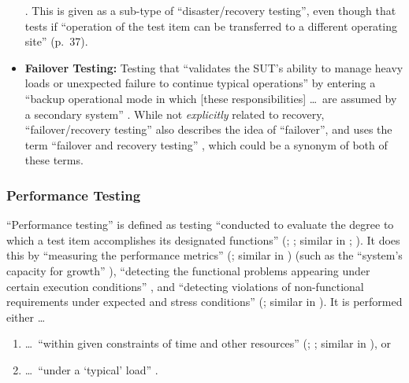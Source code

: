 \begin{itemize}
            \citep[p.~37]{IEEE2021}. This is given as a sub-type of
            ``disaster/recovery testing'', even though that tests if ``operation
            of the test item can be transferred to a different operating site''
            (p.~37).
      \item \textbf{Failover Testing:} Testing that ``validates the SUT's
            ability to manage heavy loads or unexpected failure to continue
            typical operations'' \citep[p.~5-9]{SWEBOK2024} by entering a
            ``backup operational mode in which [these responsibilities] \dots\
            are assumed by a secondary system'' \citepISTQB{}. While not
            \emph{explicitly} related to recovery, ``failover/recovery testing''
            also describes the idea of ``failover'', and \citeauthor{Firesmith2015}
            uses the term ``failover and recovery testing''
            \citeyearpar[p.~56]{Firesmith2015}, which could be a synonym of
            both of these terms.
\end{itemize}

\subsubsection{Performance Testing}
\label{perf-test-ambiguity}

``Performance testing'' is defined as testing ``conducted to evaluate the
degree to which a test item accomplishes its designated functions''
(\citealp[p.~7]{IEEE2022}; \citeyear[p.~320]{IEEE2017}; similar in
\citeyear[pp.~38-39]{IEEE2021}; \citealp[p.~1187]{Moghadam2019}). It does this
by ``measuring the performance metrics'' (\citealp[p.~1187]{Moghadam2019};
similar in \citealpISTQB{}) (such as the ``system's capacity for growth''
\citep[p.~23]{Gerrard2000b}), ``detecting the functional problems appearing
under certain execution conditions'' \citep[p.~1187]{Moghadam2019}, and
``detecting violations of non-functional requirements under expected and
stress conditions'' (\citealp[p.~1187]{Moghadam2019}; similar in
\citep[p.~5-9]{SWEBOK2024}). It is performed either \dots\
\begin{enumerate}
      \item \dots\ ``within given constraints of time and other resources''
            (\citealp[p.~7]{IEEE2022}; \citeyear[p.~320]{IEEE2017}; similar in
            \citealp[p.~1187]{Moghadam2019}), or
      \item \dots\ ``under a `typical' load'' \citep[p.~39]{IEEE2021}.
\end{enumerate}

